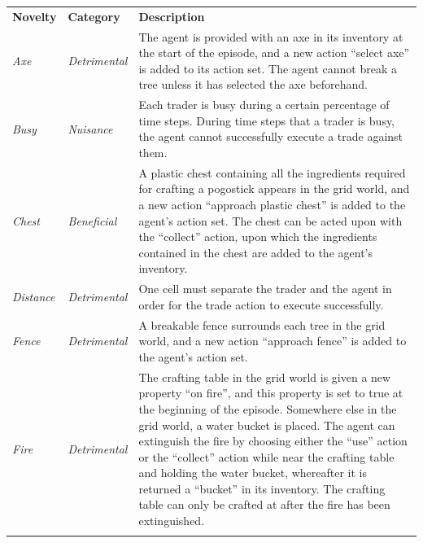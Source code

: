 \begin{table}[!tb]
    \centering
    \footnotesize
    \begin{tabular}{p{2.2cm} p{2.2cm} p{9cm}}
    \toprule
    
    \textbf{Novelty} & \textbf{Category}  & \textbf{Description} \tabularnewline  \arrayrulecolor{taupegray} \midrule
    
    \emph{Axe} & \emph{Detrimental} & The agent is provided with an axe in its inventory at the start of the episode, and a new action ``select axe'' is added to its action set. The agent cannot break a tree unless it has selected the axe beforehand. \tabularnewline
    \arrayrulecolor{taupegray} \midrule
    
    \emph{Busy} & \emph{Nuisance} & Each trader is busy during a certain percentage of time steps. During time steps that a trader is busy, the agent cannot successfully execute a trade against them. \tabularnewline
    \arrayrulecolor{taupegray} \midrule
    
    \emph{Chest} & \emph{Beneficial} & A plastic chest containing all the ingredients required for crafting a pogostick appears in the grid world, and a new action ``approach plastic chest'' is added to the agent's action set. The chest can be acted upon with the ``collect'' action, upon which the ingredients contained in the chest are added to the agent's inventory.  \tabularnewline
    \arrayrulecolor{taupegray} \midrule
    
    \emph{Distance} & \emph{Detrimental} & One cell must separate the trader and the agent in order for the trade action to execute successfully. \tabularnewline
    \arrayrulecolor{taupegray} \midrule
    
    \emph{Fence} & \emph{Detrimental} & A breakable fence surrounds each tree in the grid world, and a new action ``approach fence'' is added to the agent's action set. \tabularnewline
    \arrayrulecolor{taupegray} \midrule
    
    \emph{Fire} & \emph{Detrimental} & The crafting table in the grid world is given a new property ``on fire'', and this property is set to true at the beginning of the episode. Somewhere else in the grid world, a water bucket is placed. The agent can extinguish the fire by choosing either the ``use'' action or the ``collect'' action while near the crafting table and holding the water bucket, whereafter it is returned a ``bucket'' in its inventory. The crafting table can only be crafted at after the fire has been extinguished. \tabularnewline
    \arrayrulecolor{taupegray} \midrule
    

\end{tabular}
\end{table}
